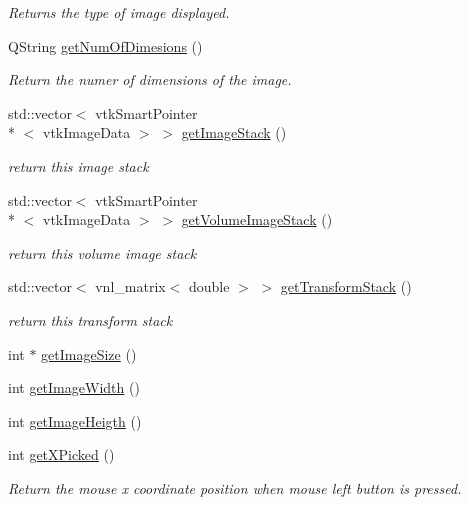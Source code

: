 \begin{DoxyCompactItemize}
\begin{DoxyCompactList}\small\item\em Returns the type of image displayed. \end{DoxyCompactList}\item 
Q\-String \hyperlink{class_q_v_t_k_image_widget_ac1b3215b0360177a7dfaad8461f42790}{get\-Num\-Of\-Dimesions} ()
\begin{DoxyCompactList}\small\item\em Return the numer of dimensions of the image. \end{DoxyCompactList}\item 
std\-::vector$<$ vtk\-Smart\-Pointer\\*
$<$ vtk\-Image\-Data $>$ $>$ \hyperlink{class_q_v_t_k_image_widget_a912b460d82be67f391cb1375429ffea7}{get\-Image\-Stack} ()
\begin{DoxyCompactList}\small\item\em return this image stack \end{DoxyCompactList}\item 
std\-::vector$<$ vtk\-Smart\-Pointer\\*
$<$ vtk\-Image\-Data $>$ $>$ \hyperlink{class_q_v_t_k_image_widget_ad3ba7cb20d5ffde7777952a268139cbe}{get\-Volume\-Image\-Stack} ()
\begin{DoxyCompactList}\small\item\em return this volume image stack \end{DoxyCompactList}\item 
std\-::vector$<$ vnl\-\_\-matrix$<$ double $>$ $>$ \hyperlink{class_q_v_t_k_image_widget_a8a0bb01f7a6e19b4745296362d8e321c}{get\-Transform\-Stack} ()
\begin{DoxyCompactList}\small\item\em return this transform stack \end{DoxyCompactList}\item 
int $\ast$ \hyperlink{class_q_v_t_k_image_widget_aa2dc225bbfe290f57b0c61bde02566a8}{get\-Image\-Size} ()
\item 
int \hyperlink{class_q_v_t_k_image_widget_a73a82e34e589dc83bc98ea482ac49f53}{get\-Image\-Width} ()
\item 
int \hyperlink{class_q_v_t_k_image_widget_afbaa4d7a3881794acaef89eab7ad23ec}{get\-Image\-Heigth} ()
\item 
int \hyperlink{class_q_v_t_k_image_widget_a4d7064fe8b60c16ce6e33122595850f2}{get\-X\-Picked} ()
\begin{DoxyCompactList}\small\item\em Return the mouse x coordinate position when mouse left button is pressed. \end{DoxyCompactList}\item 

\end{DoxyCompactItemize}
